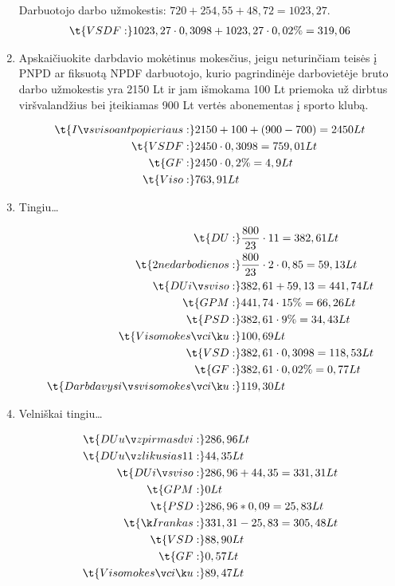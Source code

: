 \begin{enumerate}
    Darbuotojo darbo užmokestis: $720 + 254,55 + 48,72 = 1023,27$.
    \begin{align*}
      \t{VSDF:} & 1023,27 \cdot 0,3098 + 1023,27 \cdot 0,02\% = 319,06 \\
    \end{align*}

  \item Apskaičiuokite darbdavio mokėtinus mokesčius, jeigu neturinčiam
    teisės į PNPD ar fiksuotą NPDF darbuotojo, kurio pagrindinėje
    darbovietėje bruto darbo užmokestis yra 2150 Lt ir jam išmokama
    100 Lt priemoka už dirbtus viršvalandžius bei įteikiamas 900 Lt
    vertės abonementas į sporto klubą.

    \begin{align*}
      \t{Iš viso ant popieriaus: } & 2150 + 100 + (900 - 700) = 2450 Lt \\
      \t{VSDF:} & 2450 \cdot 0,3098 = 759,01 Lt \\
      \t{GF:} & 2450 \cdot 0,2 \% = 4,9 Lt \\
      \t{Viso:} & 763,91 Lt \\
    \end{align*}

  \item Tingiu…

    \begin{align*}
      \t{DU:} & \frac{800}{23} \cdot 11 = 382,61 Lt \\
      \t{2 nedarbo dienos:} &
        \frac{800}{23} \cdot 2 \cdot 0,85 = 59,13 Lt \\
      \t{DU iš viso:} & 382,61 + 59,13 = 441,74 Lt \\
      \t{GPM:} & 441,74 \cdot 15\% = 66,26 Lt \\
      \t{PSD:} & 382,61 \cdot 9\% = 34,43 Lt \\
      \t{Viso mokesčių:} & 100,69 Lt \\
      \t{VSD:} & 382,61 \cdot 0,3098 = 118,53 Lt \\
      \t{GF:} & 382,61 \cdot 0,02 \% = 0,77 Lt \\
      \t{Darbdavys iš viso mokesčių:} & 119,30 Lt \\
    \end{align*}

  \item Velniškai tingiu…

    \begin{align*}
      \t{DU už pirmas dvi:} & 286,96 Lt \\
      \t{DU už likusias 11:} & 44,35 Lt \\
      \t{DU iš viso:} & 286,96 + 44,35 = 331,31 Lt \\
      \t{GPM:} & 0 Lt \\
      \t{PSD:} & 286,96 * 0,09 = 25,83 Lt \\
      \t{Į rankas:} & 331,31 - 25,83 = 305,48 Lt \\
      \t{VSD:} & 88,90 Lt \\
      \t{GF:} & 0,57 Lt \\
      \t{Viso mokesčių:} & 89,47 Lt \\
    \end{align*}
    

\end{enumerate}
